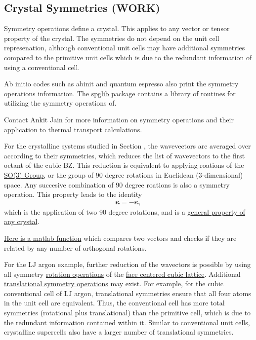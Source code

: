 \subsection{\label{A:symmetry}Crystal Symmetries (WORK)}

Symmetry operations define a crystal. 
This applies to any vector or tensor property of the crystal. The 
symmetries do not depend on the unit cell represenation, although 
conventional unit cells may have additional symmetries compared 
to the primitive unit cells which is due to the redundant information of 
using a conventional cell. 

Ab initio codes such as abinit and quantum espresso also print the 
symmetry operations information. The 
\href{http://spglib.sourceforge.net/}{spglib} 
package contains a library of routines for utilizing the 
symmetry operations of.

Contact Ankit Jain for more information on symmetry operations 
and their application to thermal transport calculations. 

For the crystalline systems studied in Section , the wavevectors 
are averaged over according to their symmetries, 
which reduces the list of wavevectors to the first octant of the 
cubic BZ.\cite{mcgaughey_phonon_2004} This reduction is equivalent 
to applying roations of the 
\href{http://en.wikipedia.org/wiki/Rotation_group_SO(3)}
{SO(3) Group}, or the group of 90 degree rotations in Euclidean 
(3-dimensional) space. 
Any succesive combination of 90 degree roations is also a symmetry 
operation. This property leads to the identity
\begin{equation}\label{EQ:kpt_sym}
 \begin{split}
  \pmb{\kappa} = -\pmb{\kappa},
 \end{split}
\end{equation}
which is the application of two 90 degree rotations, and is a 
\href{http://en.wikipedia.org/wiki/Parity_(physics)#Odd}
{general property of any crystal}. 

\href{https://github.com/jasonlarkin/disorder/blob/master/matlab/issym.m}
{Here is a matlab function} which compares two vectors 
and checks if they are related by any number of orthogonal 
rotations.

For the LJ argon example, further reduction  of the wavectors is 
possible by using all symmetry 
\href{http://spglib.sourceforge.net/#rotation}{rotation operations} 
of the 
\href{http://www.wolframalpha.com/input/?i=face-centered+cubic}
{face centered cubic lattice}. Additional 
\href{http://en.wikipedia.org/wiki/Translational_symmetry}
{translational symmetry operations} may exist. 
For example, for the cubic conventional cell of LJ argon, translational 
symmetries ensure that all four atoms in the unit cell are 
equivalent. Thus, the conventional cell has more total 
symmetries (rotational plus translational) than the primitive cell, 
which is due to the redundant information contained within it. Similar 
to conventional unit cells, crystalline supercells also have a larger 
number of translational symmetries.

